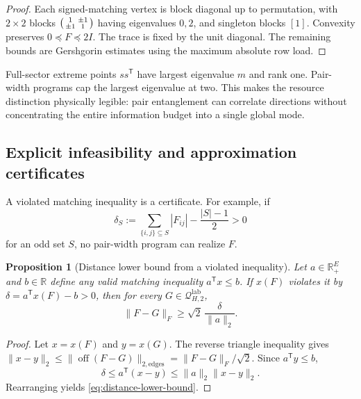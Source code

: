 \documentclass[11pt]{article}
\newtheorem{proposition}[proposition]{Proposition}
\theoremstyle{definition}
\theoremstyle{remark}
\newcommand{\R}{\mathbb{R}}
\newcommand{\Q}{\mathcal{Q}}
\newcommand{\off}{\operatorname{off}}
\newcommand{\lab}{\mathrm{lab}}
\begin{document}
\begin{proof}
Each signed-matching vertex is block diagonal up to permutation, with $2\times2$ blocks $\begin{psmallmatrix}1&\pm1\\\pm1&1\end{psmallmatrix}$ having eigenvalues $0,2$, and singleton blocks $[1]$. Convexity preserves $0\preceq F\preceq2I$. The trace is fixed by the unit diagonal. The remaining bounds are Gershgorin estimates using the maximum absolute row load.
\end{proof}

Full-sector extreme points $ss^{\mathsf T}$ have largest eigenvalue $m$ and rank one. Pair-width programs cap the largest eigenvalue at two. This makes the resource distinction physically legible: pair entanglement can correlate directions without concentrating the entire information budget into a single global mode.

\subsection{Explicit infeasibility and approximation certificates}
A violated matching inequality is a certificate. For example, if
\begin{equation}
  \delta_S
  :=\sum_{\{i,j\}\subseteq S}|F_{ij}|-\frac{|S|-1}{2}>0
\end{equation}
for an odd set $S$, no pair-width program can realize $F$.

\begin{proposition}[Distance lower bound from a violated inequality]
\label{prop:distance-certificate}
Let $a\in\R^E_+$ and $b\in\R$ define any valid matching inequality $a^{\mathsf T}x\le b$. If $x(F)$ violates it by $\delta=a^{\mathsf T}x(F)-b>0$, then for every $G\in\Q^{\lab}_{H,2}$,
\begin{equation}
  \|F-G\|_F
  \ge\sqrt2\,\frac{\delta}{\|a\|_2}.
  \label{eq:distance-lower-bound}
\end{equation}
\end{proposition}

\begin{proof}
Let $x=x(F)$ and $y=x(G)$. The reverse triangle inequality gives $\|x-y\|_2\le\|\off(F-G)\|_{2,\mathrm{edges}}=\|F-G\|_F/\sqrt2$. Since $a^{\mathsf T}y\le b$,
\begin{equation}
  \delta\le a^{\mathsf T}(x-y)\le\|a\|_2\|x-y\|_2.
\end{equation}
Rearranging yields \cref{eq:distance-lower-bound}.
\end{proof}
\end{document}
